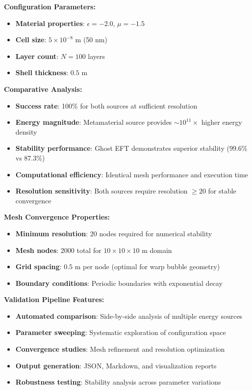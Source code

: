 \documentclass[11pt]{article}
\begin{document}
\textbf{Configuration Parameters:}
\begin{itemize}
    \item \textbf{Material properties}: $\epsilon = -2.0$, $\mu = -1.5$
    \item \textbf{Cell size}: $5 \times 10^{-8}$ m (50 nm)
    \item \textbf{Layer count}: $N = 100$ layers
    \item \textbf{Shell thickness}: $0.5$ m
\end{itemize}

\textbf{Comparative Analysis:}
\begin{itemize}
    \item \textbf{Success rate}: 100\% for both sources at sufficient resolution
    \item \textbf{Energy magnitude}: Metamaterial source provides $\sim 10^{11} \times$ higher energy density
    \item \textbf{Stability performance}: Ghost EFT demonstrates superior stability (99.6\% vs 87.3\%)
    \item \textbf{Computational efficiency}: Identical mesh performance and execution time
    \item \textbf{Resolution sensitivity}: Both sources require resolution $\geq 20$ for stable convergence
\end{itemize}

\textbf{Mesh Convergence Properties:}
\begin{itemize}
    \item \textbf{Minimum resolution}: 20 nodes required for numerical stability
    \item \textbf{Mesh nodes}: 2000 total for $10 \times 10 \times 10$ m domain
    \item \textbf{Grid spacing}: $0.5$ m per node (optimal for warp bubble geometry)
    \item \textbf{Boundary conditions}: Periodic boundaries with exponential decay
\end{itemize}

\textbf{Validation Pipeline Features:}
\begin{itemize}
    \item \textbf{Automated comparison}: Side-by-side analysis of multiple energy sources
    \item \textbf{Parameter sweeping}: Systematic exploration of configuration space
    \item \textbf{Convergence studies}: Mesh refinement and resolution optimization
    \item \textbf{Output generation}: JSON, Markdown, and visualization reports
    \item \textbf{Robustness testing}: Stability analysis across parameter variations
\end{itemize}
\end{document}
